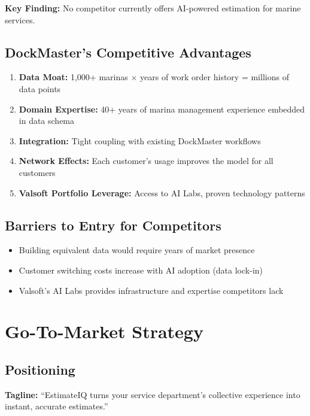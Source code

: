 \documentclass[11pt,a4paper]{article}
\begin{document}
\textbf{Key Finding:} No competitor currently offers AI-powered estimation for marine services.

\subsection{DockMaster's Competitive Advantages}

\begin{enumerate}[leftmargin=*]
    \item \textbf{Data Moat:} 1,000+ marinas $\times$ years of work order history = millions of data points
    \item \textbf{Domain Expertise:} 40+ years of marina management experience embedded in data schema
    \item \textbf{Integration:} Tight coupling with existing DockMaster workflows
    \item \textbf{Network Effects:} Each customer's usage improves the model for all customers
    \item \textbf{Valsoft Portfolio Leverage:} Access to AI Labs, proven technology patterns
\end{enumerate}

\subsection{Barriers to Entry for Competitors}

\begin{itemize}[leftmargin=*]
    \item Building equivalent data would require years of market presence
    \item Customer switching costs increase with AI adoption (data lock-in)
    \item Valsoft's AI Labs provides infrastructure and expertise competitors lack
\end{itemize}

\newpage
\section{Go-To-Market Strategy}

\subsection{Positioning}

\textbf{Tagline:} ``EstimateIQ turns your service department's collective experience into instant, accurate estimates.''
\end{document}
